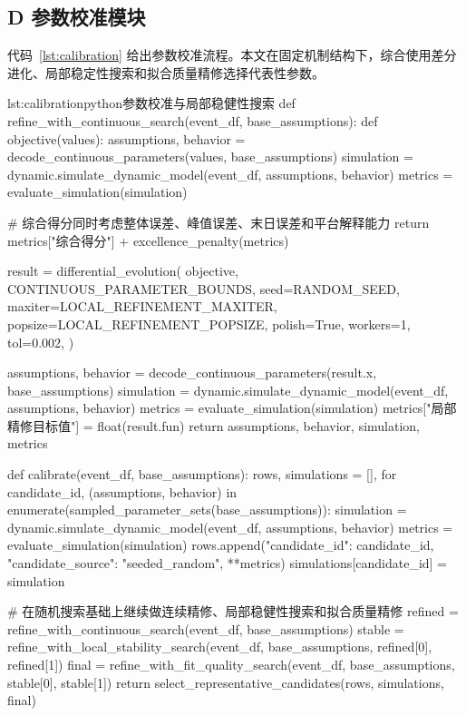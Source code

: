 \subsection*{D 参数校准模块}

代码~\ref{lst:calibration} 给出参数校准流程。本文在固定机制结构下，综合使用差分进化、局部稳定性搜索和拟合质量精修选择代表性参数。

\begin{paperlisting}{lst:calibration}{python}{参数校准与局部稳健性搜索}
def refine_with_continuous_search(event_df, base_assumptions):
    def objective(values):
        assumptions, behavior = decode_continuous_parameters(values, base_assumptions)
        simulation = dynamic.simulate_dynamic_model(event_df, assumptions, behavior)
        metrics = evaluate_simulation(simulation)

        # 综合得分同时考虑整体误差、峰值误差、末日误差和平台解释能力
        return metrics["综合得分"] + excellence_penalty(metrics)

    result = differential_evolution(
        objective,
        CONTINUOUS_PARAMETER_BOUNDS,
        seed=RANDOM_SEED,
        maxiter=LOCAL_REFINEMENT_MAXITER,
        popsize=LOCAL_REFINEMENT_POPSIZE,
        polish=True,
        workers=1,
        tol=0.002,
    )

    assumptions, behavior = decode_continuous_parameters(result.x, base_assumptions)
    simulation = dynamic.simulate_dynamic_model(event_df, assumptions, behavior)
    metrics = evaluate_simulation(simulation)
    metrics["局部精修目标值"] = float(result.fun)
    return assumptions, behavior, simulation, metrics

def calibrate(event_df, base_assumptions):
    rows, simulations = [], {}
    for candidate_id, (assumptions, behavior) in enumerate(sampled_parameter_sets(base_assumptions)):
        simulation = dynamic.simulate_dynamic_model(event_df, assumptions, behavior)
        metrics = evaluate_simulation(simulation)
        rows.append({"candidate_id": candidate_id, "candidate_source": "seeded_random",
                     **metrics})
        simulations[candidate_id] = simulation

    # 在随机搜索基础上继续做连续精修、局部稳健性搜索和拟合质量精修
    refined = refine_with_continuous_search(event_df, base_assumptions)
    stable = refine_with_local_stability_search(event_df, base_assumptions,
                                                refined[0], refined[1])
    final = refine_with_fit_quality_search(event_df, base_assumptions,
                                           stable[0], stable[1])
    return select_representative_candidates(rows, simulations, final)
\end{paperlisting}

\clearpage
